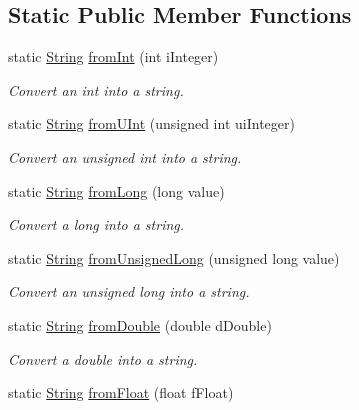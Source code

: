 \subsection*{Static Public Member Functions}
\begin{DoxyCompactItemize}
\item 
static \mbox{\hyperlink{class_rad_j_a_v_1_1_string}{String}} \mbox{\hyperlink{class_rad_j_a_v_1_1_string_a6062497071348a2d203341c2f650085d}{from\+Int}} (int i\+Integer)
\begin{DoxyCompactList}\small\item\em Convert an int into a string. \end{DoxyCompactList}\item 
static \mbox{\hyperlink{class_rad_j_a_v_1_1_string}{String}} \mbox{\hyperlink{class_rad_j_a_v_1_1_string_aa630d3d33cf4b501d1a62fa7eff6a575}{from\+U\+Int}} (unsigned int ui\+Integer)
\begin{DoxyCompactList}\small\item\em Convert an unsigned int into a string. \end{DoxyCompactList}\item 
static \mbox{\hyperlink{class_rad_j_a_v_1_1_string}{String}} \mbox{\hyperlink{class_rad_j_a_v_1_1_string_a037777a57b94a36a6f55cc88d5a1b647}{from\+Long}} (long value)
\begin{DoxyCompactList}\small\item\em Convert a long into a string. \end{DoxyCompactList}\item 
static \mbox{\hyperlink{class_rad_j_a_v_1_1_string}{String}} \mbox{\hyperlink{class_rad_j_a_v_1_1_string_a8dafc3ee64efa449f35add3f598f0281}{from\+Unsigned\+Long}} (unsigned long value)
\begin{DoxyCompactList}\small\item\em Convert an unsigned long into a string. \end{DoxyCompactList}\item 
static \mbox{\hyperlink{class_rad_j_a_v_1_1_string}{String}} \mbox{\hyperlink{class_rad_j_a_v_1_1_string_a5501161ff54528c58720c23a30397519}{from\+Double}} (double d\+Double)
\begin{DoxyCompactList}\small\item\em Convert a double into a string. \end{DoxyCompactList}\item 
static \mbox{\hyperlink{class_rad_j_a_v_1_1_string}{String}} \mbox{\hyperlink{class_rad_j_a_v_1_1_string_a2dd011b85984bd4c4199b5fa07b24c6a}{from\+Float}} (float f\+Float)

\end{DoxyCompactItemize}
